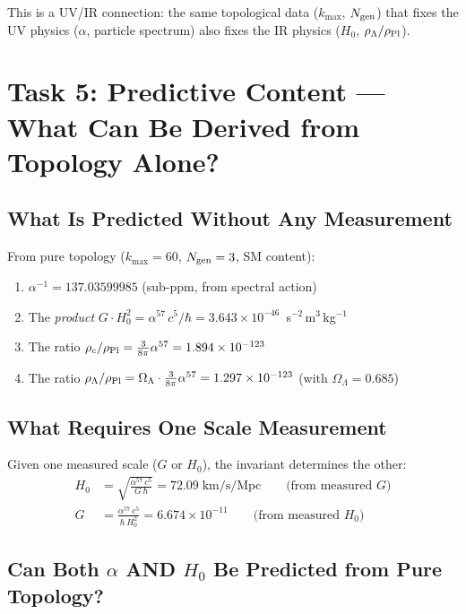 \documentclass[11pt]{article}
\begin{document}
This is a UV/IR connection: the same topological data ($k_{\max}$, $N_{\rm gen}$)
that fixes the UV physics ($\alpha$, particle spectrum) also fixes the IR physics
($H_0$, $\rho_\Lambda/\rho_{\rm Pl}$).

\section{Task 5: Predictive Content --- What Can Be Derived from Topology Alone?}
\label{sec:predictive}

\subsection{What Is Predicted Without Any Measurement}

From pure topology ($k_{\max} = 60$, $N_{\rm gen} = 3$, SM content):
\begin{enumerate}
\item $\alpha^{-1} = 137.03599985$ \quad (sub-ppm, from spectral action)
\item The \emph{product} $G \cdot H_0^2 = \alpha^{57}\,c^5/\hbar
      = 3.643 \times 10^{-46}$~s$^{-2}$\,m$^3$\,kg$^{-1}$
\item The ratio $\rho_c/\rho_{\rm Pl} = \frac{3}{8\pi}\alpha^{57}
      = 1.894 \times 10^{-123}$
\item The ratio $\rho_\Lambda/\rho_{\rm Pl}
      = \Omega_\Lambda \cdot \frac{3}{8\pi}\alpha^{57}
      = 1.297 \times 10^{-123}$ \quad (with $\Omega_\Lambda = 0.685$)
\end{enumerate}

\subsection{What Requires One Scale Measurement}

Given one measured scale ($G$ or $H_0$), the invariant determines the other:
\begin{align}
H_0 &= \sqrt{\frac{\alpha^{57}\,c^5}{G\,\hbar}}
= 72.09\;\text{km/s/Mpc} \qquad\text{(from measured $G$)} \\[6pt]
G &= \frac{\alpha^{57}\,c^5}{\hbar\,H_0^2}
= 6.674 \times 10^{-11} \qquad\text{(from measured $H_0$)}
\end{align}

\subsection{Can Both $\alpha$ AND $H_0$ Be Predicted from Pure Topology?}
\end{document}
